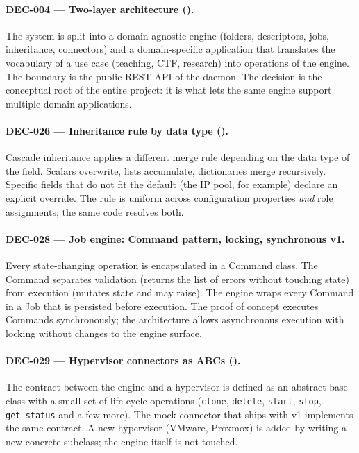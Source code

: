 \paragraph{DEC-004 — Two-layer architecture ().}
The system is split into a domain-agnostic engine (folders,
descriptors, jobs, inheritance, connectors) and a domain-specific
application that translates the vocabulary of a use case (teaching,
CTF, research) into operations of the engine. The boundary is the
public REST API of the daemon. The decision is the conceptual root
of the entire project: it is what lets the same engine support
multiple domain applications.

\paragraph{DEC-026 — Inheritance rule by data type ().}
Cascade inheritance applies a different merge rule depending on the
data type of the field. Scalars overwrite, lists accumulate,
dictionaries merge recursively. Specific fields that do not fit the
default (the IP pool, for example) declare an explicit override.
The rule is uniform across configuration properties \emph{and} role
assignments; the same code resolves both.

\paragraph{DEC-028 — Job engine: Command pattern, locking, synchronous v1.}
Every state-changing operation is encapsulated in a Command class.
The Command separates validation (returns the list of errors
without touching state) from execution (mutates state and may
raise). The engine wraps every Command in a Job that is persisted
before execution. The proof of concept executes Commands
synchronously; the architecture allows asynchronous execution with
locking without changes to the engine surface.

\paragraph{DEC-029 — Hypervisor connectors as ABCs ().}
The contract between the engine and a hypervisor is defined as an
abstract base class with a small set of life-cycle operations
(\texttt{clone}, \texttt{delete}, \texttt{start}, \texttt{stop},
\texttt{get\_status} and a few more). The mock connector that ships
with v1 implements the same contract. A new hypervisor (VMware,
Proxmox) is added by writing a new concrete subclass; the engine
itself is not touched.

